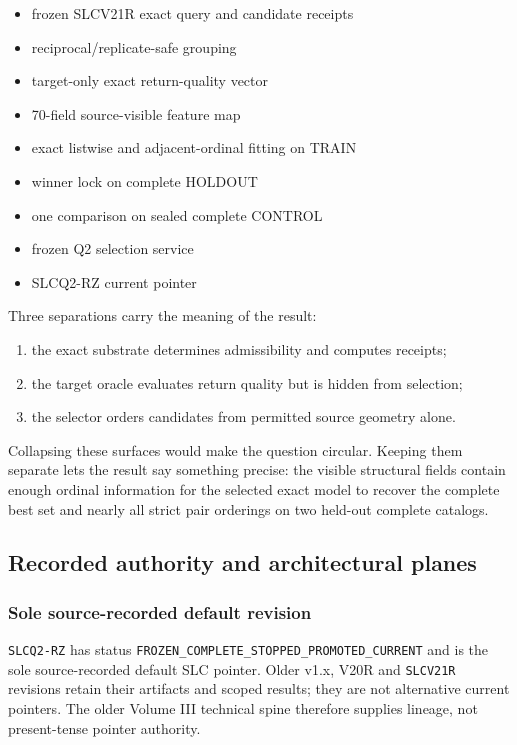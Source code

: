 \begin{itemize}
\tightlist
\item
  frozen SLCV21R exact query and candidate receipts
\item
  reciprocal/replicate-safe grouping
\item
  target-only exact return-quality vector
\item
  70-field source-visible feature map
\item
  exact listwise and adjacent-ordinal fitting on TRAIN
\item
  winner lock on complete HOLDOUT
\item
  one comparison on sealed complete CONTROL
\item
  frozen Q2 selection service
\item
  SLCQ2-RZ current pointer
\end{itemize}

Three separations carry the meaning of the result:

\begin{enumerate}
\def\labelenumi{\arabic{enumi}.}
\tightlist
\item
  the exact substrate determines admissibility and computes receipts;
\item
  the target oracle evaluates return quality but is hidden from
  selection;
\item
  the selector orders candidates from permitted source geometry alone.
\end{enumerate}

Collapsing these surfaces would make the question circular. Keeping them
separate lets the result say something precise: the visible structural
fields contain enough ordinal information for the selected exact model
to recover the complete best set and nearly all strict pair orderings on
two held-out complete catalogs.

\subsection{Recorded authority and architectural
planes}\label{viii-ch07-recorded-authority-and-architectural-planes}

\subsubsection{Sole source-recorded default
revision}\label{viii-ch07-sole-source-recorded-default-revision}

\texttt{SLCQ2-RZ} has status
\nolinkurl{FROZEN_COMPLETE_STOPPED_PROMOTED_CURRENT} and is the sole
source-recorded default SLC pointer. Older v1.x, V20R and
\texttt{SLCV21R} revisions retain their artifacts and scoped results;
they are not alternative current pointers. The older Volume III
technical spine therefore supplies lineage, not present-tense pointer
authority.

